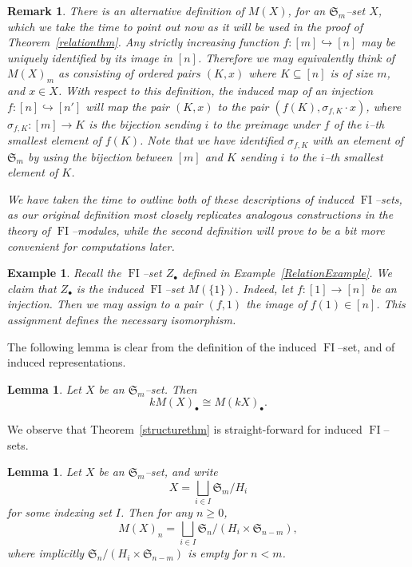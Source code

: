\documentclass[10pt]{amsart}
\DeclareMathOperator{\FI}{FI}
\newcommand{\Sn}{\mathfrak{S}}
\newcommand{\dt}{\bullet}
\newtheorem{lemma}[theorem]{Lemma}
\newtheorem{example}[theorem]{Example}
\newtheorem{remark}[theorem]{Remark}
\theoremstyle{definition}
\begin{document}
\begin{remark}\label{otherdescription}
There is an alternative definition of $M(X)$, for an $\Sn_m$--set $X$, which we take the time to point out now as it will be used in the proof of Theorem~\ref{relationthm}. Any strictly increasing function $f:[m] \hookrightarrow [n]$ may be uniquely identified by its image in $[n]$. Therefore we may equivalently think of $M(X)_m$ as consisting of ordered pairs $(K,x)$ where $K \subseteq [n]$ is of size $m$, and $x \in X$. With respect to this definition, the induced map of an injection $f:[n] \hookrightarrow [n']$ will map the pair $(K,x)$ to the pair $(f(K),\sigma_{f,K} \cdot x)$, where $\sigma_{f,K}: [m] \rightarrow K$ is the bijection sending $i$ to the preimage under $f$ of the $i$--th smallest element of $f(K)$. Note that we have identified $\sigma_{f,K}$ with an element of $\Sn_m$ by using the bijection between $[m]$ and $K$ sending $i$ to the $i$--th smallest element of $K$.

We have taken the time to outline both of these descriptions of induced $\FI$--sets, as our original definition most closely replicates analogous constructions in the theory of $\FI$--modules, while the second definition will prove to be a bit more convenient for computations later.
\end{remark}

\begin{example}
Recall the $\FI$--set $Z_\dt$ defined in Example~\ref{RelationExample}. We claim that $Z_\dt$ is the induced $\FI$--set $M(\{1\})$. Indeed, let $f:[1] \rightarrow [n]$ be an injection. Then we may assign to a pair $(f,1)$ the image of $f(1) \in [n]$. This assignment defines the necessary isomorphism.
\end{example}

The following lemma is clear from the definition of the induced $\FI$--set, and of induced representations. 
\begin{lemma}
Let $X$ be an $\Sn_m$--set. Then 
\[
k M(X)_\dt \cong M(k X)_\dt.
\]
\end{lemma}

We observe that Theorem~\ref{structurethm} is straight-forward for induced $\FI$--sets.

\begin{lemma}\label{inducedversion}
Let $X$ be an $\Sn_m$--set, and write
\[
X = \bigsqcup_{i \in I} \Sn_m/H_i
\]
for some indexing set $I$. Then for any $n \geq 0$,
\[
M(X)_n = \bigsqcup_{i \in I} \Sn_n/(H_i \times \Sn_{n-m}),
\]
where implicitly $\Sn_n/(H_i \times \Sn_{n-m})$ is empty for $n < m$.
\end{lemma}
\end{document}
